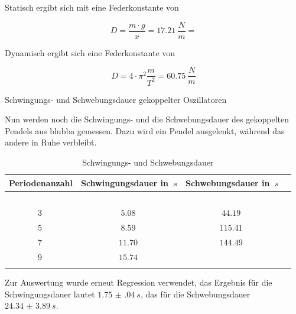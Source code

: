 Statisch ergibt sich mit eine Federkonstante von

\begin{equation}
    D = \frac{m \cdot g}{x} =\SI{17,21}{\frac{N}{m}} = 
\end{equation}

Dynamisch ergibt sich eine Federkonstante von

\begin{equation}
    D = 4 \cdot \pi^2 \frac{m}{T^2} = \SI{60,75}{\frac{N}{m}}
\end{equation}

Schwingungs- und Schwebungsdauer gekoppelter Oszillatoren

Nun werden noch die Schwingungs- und die Schwebungsdauer des gekoppelten Pendels aus blubba gemessen.
Dazu wird ein Pendel ausgelenkt, während das andere in Ruhe verbleibt.

\begin{table}[h]
    \begin{center}
        \caption{Schwingungs- und Schwebungsdauer}
        \begin{tabular}{cccc}
            \hline
            Periodenanzahl & Schwingungsdauer in $\SI{}{s}$ & Schwebungsdauer in $\SI{}{s}$ \\
            \hline
            $\SI{}{}$ & $\SI{}{}$ & $\SI{}{}$ \\
            $\SI{3}{}$ & $\SI{5,08 }{}$ & $\SI{44,19 }{}$ \\
            $\SI{5}{}$ & $\SI{8,59 }{}$ & $\SI{115,41}{}$ \\
            $\SI{7}{}$ & $\SI{11,70}{}$ & $\SI{144,49}{}$ \\
            $\SI{9}{}$ & $\SI{15,74}{}$ &  \\
            \hline
            \label{tab:Feder-dynamisch-Messwerte}
        \end{tabular}
    \end{center}
\end{table}

Zur Auswertung wurde erneut Regression verwendet, das Ergebnis für die Schwingungsdauer lautet $\SI{1.75(04)}{s}$, das für die Schwebungsdauer $\SI{24.34(389)}{s}$.